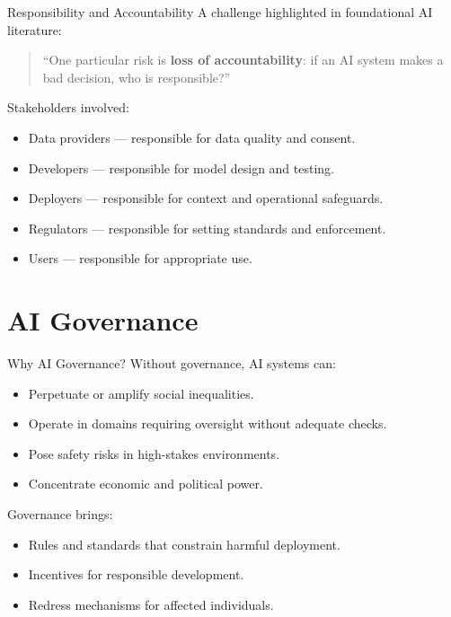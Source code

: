\documentclass[10pt]{beamer}
\begin{document}
\begin{frame}{Responsibility and Accountability}
    A challenge highlighted in foundational AI literature:

    \begin{quote}
        \small ``One particular risk is \textbf{loss of accountability}: if an AI system makes a bad decision, who is responsible?''
    \end{quote}

    \vspace{0.1cm}
    Stakeholders involved:
    \begin{itemize}
        \item Data providers --- responsible for data quality and consent.
        \item Developers --- responsible for model design and testing.
        \item Deployers --- responsible for context and operational safeguards.
        \item Regulators --- responsible for setting standards and enforcement.
        \item Users --- responsible for appropriate use.
    \end{itemize}
\end{frame}

\section{AI Governance}

\begin{frame}{Why AI Governance?}
    Without governance, AI systems can:
    \begin{itemize}
        \item Perpetuate or amplify social inequalities.
        \item Operate in domains requiring oversight without adequate checks.
        \item Pose safety risks in high-stakes environments.
        \item Concentrate economic and political power.
    \end{itemize}

    \vspace{0.2cm}
    Governance brings:
    \begin{itemize}
        \item Rules and standards that constrain harmful deployment.
        \item Incentives for responsible development.
        \item Redress mechanisms for affected individuals.
    \end{itemize}
\end{frame}
\end{document}
